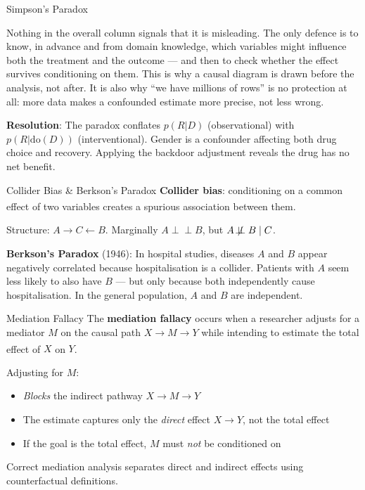 \begin{v3topic}{Simpson’s Paradox}
\begin{cautionbox}
Nothing in the overall column signals that it is misleading. The only defence
is to know, in advance and from domain knowledge, which variables might
influence both the treatment and the outcome --- and then to check whether the
effect survives conditioning on them. This is why a causal diagram is drawn
before the analysis, not after. It is also why ``we have millions of rows'' is
no protection at all: more data makes a confounded estimate more precise, not
less wrong.
\end{cautionbox}

    \textbf{Resolution}: The paradox conflates $p(R|D)$ (observational)
    with $p(R|\mathrm{do}(D))$ (interventional). Gender is a confounder
    affecting both drug choice and recovery. Applying the backdoor
    adjustment reveals the drug has no net benefit.

\end{v3topic}
\begin{v3topic}{Collider Bias \& Berkson’s Paradox}
    \textbf{Collider bias}: conditioning on a common effect of two variables
    creates a spurious association between
    them.\textsuperscript{\cite[][p.~43]{barberBayesianReasoningMachine2012}}

    Structure: $A \to C \leftarrow B$. Marginally $A \perp\!\!\!\perp B$, but
    $A \not\!\perp\!\!\!\perp B \mid C$.

    \textbf{Berkson’s Paradox} (1946): In hospital studies, diseases $A$ and
    $B$ appear negatively correlated because hospitalisation is a collider.
    Patients with $A$ seem less likely to also have $B$ --- but only because
    both independently cause hospitalisation. In the general population, $A$
    and $B$ are independent.

\end{v3topic}
\begin{v3topic}{Mediation Fallacy}
    The \textbf{mediation fallacy} occurs when a researcher adjusts for a
    mediator $M$ on the causal path $X \to M \to Y$ while intending to
    estimate the total effect of $X$ on
    $Y$.\textsuperscript{\cite[][Ch.~9]{pearlCausalityModelsReasoning2009}}

    Adjusting for $M$:
    \begin{itemize}
        \item \emph{Blocks} the indirect pathway $X \to M \to Y$
        \item The estimate captures only the \emph{direct} effect $X \to Y$,
              not the total effect
        \item If the goal is the total effect, $M$ must \emph{not} be
              conditioned on
    \end{itemize}

    Correct mediation analysis separates direct and indirect effects using
    counterfactual definitions.

\end{v3topic}
